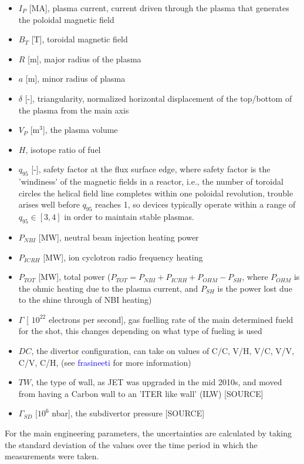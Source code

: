 \documentclass[a4paper, twoside, final, 12pt]{article}
\begin{document}
\begin{itemize}
	\item $I_P$ [MA], plasma current, current driven through the plasma that generates the poloidal magnetic field
	\item $B_T$ [T], toroidal magnetic field 
	\item $R$ [m], major radius of the plasma
	\item $a$ [m], minor radius of plasma
	\item $\delta$ [-], triangularity, normalized horizontal displacement of the top/bottom of the plasma from the main axis
	\item $V_P$ [m$^3$], the plasma volume
	\item $H$, isotope ratio of fuel
	\item $q_{95}$ [-], safety factor at the flux surface edge, where safety factor is the 'windiness' of the magnetic fields in a reactor, i.e., the  number of toroidal circles the helical field line completes within one poloidal revolution, trouble arises well before $q_{95}$ reaches 1, so devices typically operate within a range of $q_{95} \in [3, 4]$ in order to maintain stable plasmas.
	\item $P_{NBI}$ [MW], neutral beam injection heating power
	\item $P_{ICRH}$ [MW], ion cyclotron radio frequency heating 
	\item $P_{TOT}$ [MW], total power ($P_{TOT} = P_{NBI}+ P_{ICRH} + P_{OHM} - P_{SH}$, where $P_{OHM}$ is the ohmic heating due to the plasma current, and $P_{SH}$ is the power lost due to the shine through of NBI heating)
	\item $\Gamma$ [ $10^{22}$ electrons per second], gas fuelling rate of the main determined fueld for the shot, this changes depending on what type of fueling is used 
	\item $DC$, the divertor configuration, can take on values of C/C, V/H, V/C, V/V, C/V, C/H, (see \textcolor{blue}{frasineeti} for more information)
	\item $TW$, the type of wall, as JET was upgraded in the mid 2010s, and moved from having a Carbon wall to an 'ITER like wall' (ILW) [SOURCE]
	\item $\Gamma_{SD}$ [$10^6$ nbar], the subdivertor pressure [SOURCE]
\end{itemize}


For the main engineering parameters, the uncertainties are calculated by taking the standard deviation of the values over the time period in which the measurements were taken. 
\end{document}
